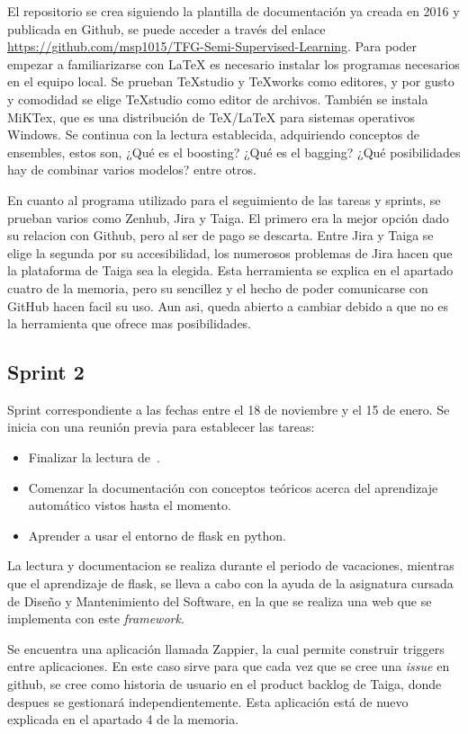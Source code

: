 El repositorio se crea siguiendo la plantilla de documentación ya creada en 2016 y publicada en Github, se puede acceder a través del enlace \url{https://github.com/msp1015/TFG-Semi-Supervised-Learning}. Para poder empezar a familiarizarse con \LaTeX{} es necesario instalar los programas necesarios en el equipo local. Se prueban TeXstudio y TeXworks como editores, y por gusto y comodidad se elige TeXstudio como editor de archivos. También se instala MiKTex, que es una distribución de \TeX/\LaTeX{} para sistemas operativos Windows.
Se continua con la lectura establecida, adquiriendo conceptos de ensembles, estos son, ¿Qué es el boosting? ¿Qué es el bagging? ¿Qué posibilidades hay de combinar varios modelos? entre otros.

En cuanto al programa utilizado para el seguimiento de las tareas y sprints, se prueban varios como Zenhub, Jira y Taiga. El primero era la mejor opción dado su relacion con Github, pero al ser de pago se descarta. Entre Jira y Taiga se elige la segunda por su accesibilidad, los numerosos problemas de Jira hacen que la plataforma de Taiga sea la elegida.
Esta herramienta se explica en el apartado cuatro de la memoria, pero su sencillez y el hecho de poder comunicarse con GitHub hacen facil su uso. Aun asi, queda abierto a cambiar debido a que no es la herramienta que ofrece mas posibilidades.
\subsection{Sprint 2}
Sprint correspondiente a las fechas entre el 18 de noviembre y el 15 de enero. Se inicia con una reunión previa para establecer las tareas: 
\begin{itemize}
	\item Finalizar la lectura de~\cite{ensembles}.
	\item Comenzar la documentación con conceptos teóricos acerca del aprendizaje automático vistos hasta el momento.
	\item  Aprender a usar el entorno de flask en python.
\end{itemize}

La lectura y documentacion se realiza durante el periodo de vacaciones, mientras que el aprendizaje de flask, se lleva a cabo con la ayuda de la asignatura cursada de Diseño y Mantenimiento del Software, en la que se realiza una web que se implementa con este \textit{framework}.

Se encuentra una aplicación llamada Zappier, la cual permite construir triggers entre aplicaciones. En este caso sirve para que cada vez que se cree una \textit{issue} en github, se cree como historia de usuario en el product backlog de Taiga, donde despues se gestionará independientemente. Esta aplicación está de nuevo explicada en el apartado 4 de la memoria. 
